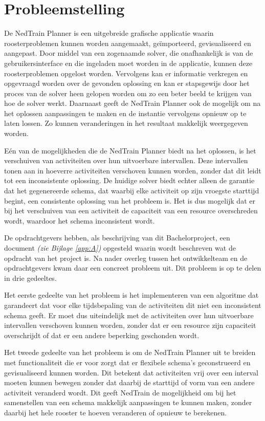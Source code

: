 \section{Probleemstelling}
\label{sec:probleemstelling}

De NedTrain Planner is een uitgebreide grafische applicatie waarin roosterproblemen kunnen worden aangemaakt, ge\"importeerd, gevisualiseerd en aangepast. Door middel van een zogenaamde solver, die onafhankelijk is van de gebruikersinterface en die ingeladen moet worden in de applicatie, kunnen deze roosterproblemen opgelost worden. Vervolgens kan er informatie verkregen en opgevraagd worden over de gevonden oplossing en kan er stapsgewijs door het proces van de solver heen gelopen worden om zo een beter beeld te krijgen van hoe de solver werkt. Daarnaast geeft de NedTrain Planner ook de mogelijk om na het oplossen aanpassingen te maken en de instantie vervolgens opnieuw op te laten lossen. Zo kunnen veranderingen in het resultaat makkelijk weergegeven worden.

E\'en van de mogelijkheden die de NedTrain Planner biedt na het oplossen, is het verschuiven van activiteiten over hun uitvoerbare intervallen. Deze intervallen tonen aan in hoeverre activiteiten verschoven kunnen worden, zonder dat dit leidt tot een inconsistente oplossing. De huidige solver biedt echter alleen de garantie dat het gegenereerde schema, dat waarbij elke activiteit op zijn vroegste starttijd begint, een consistente oplossing van het probleem is. Het is dus mogelijk dat er bij het verschuiven van een activiteit de capaciteit van een resource overschreden wordt, waardoor het schema inconsistent wordt.

De opdrachtgevers hebben, als beschrijving van dit Bachelorproject, een document \emph{(zie Bijlage \ref{app:A})} opgesteld waarin wordt beschreven wat de opdracht van het project is. Na nader overleg tussen het ontwikkelteam en de opdrachtgevers kwam daar een concreet probleem uit. Dit probleem is op te delen in drie gedeeltes. 

Het eerste gedeelte van het probleem is het implementeren van een algoritme dat garandeert dat voor elke tijdsbepaling van de activiteiten dit niet een inconsistent schema geeft. Er moet dus uiteindelijk met de activiteiten over hun uitvoerbare intervallen verschoven kunnen worden, zonder dat er een resource zijn capaciteit overschrijdt of dat er een andere beperking geschonden wordt.

Het tweede gedeelte van het probleem is om de NedTrain Planner uit te breiden met functionaliteit die er voor zorgt dat er flexibele schema's geconstrueerd en gevisualiseerd kunnen worden. Dit betekent dat activiteiten vrij over een interval moeten kunnen bewegen zonder dat daarbij de starttijd of vorm van een andere activiteit veranderd wordt. Dit geeft NedTrain de mogelijkheid om bij het samenstellen van een schema makkelijk aanpassingen te kunnen maken, zonder daarbij het hele rooster te hoeven veranderen of opnieuw te berekenen.

